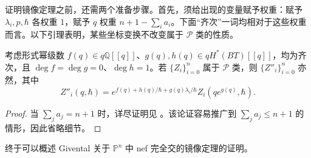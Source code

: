 证明镜像定理之前，还需两个准备步骤。首先，须给出现的变量赋予权重：赋予
$\lambda_i,p,\hbar$ 各权重 $1$，赋予 $q$ 权重 $n+1-\sum_i a_i$。下面“齐次”一词均相对于这些权重而言。以下引理表明，某些坐标变换不改变属于 $\mathcal P$ 类的性质。
\begin{lemma}\label{lem:complete-intersection-p-transformations}
考虑形式幂级数 $f(q)\in q\mathbb Q[[q]]$、$g(q),h(q)\in qH^*(BT)[[q]]$，均为齐次，且 $\deg f=\deg g=0$、$\deg h=1$。若 $\{Z_i\}_{i=0}^n$ 属于 $\mathcal P$ 类，则 $\{Z''_i\}_{i=0}^n$ 亦然，其中
\[
Z''_i(q,\hbar)=e^{f(q)+h(q)/\hbar+g(q)\lambda_i/\hbar}Z_i(qe^{g(q)},\hbar).
\]
\end{lemma}
\begin{proof}
当 $\sum_ja_j=n+1$ 时，详尽证明见 。该论证容易推广到 $\sum_ja_j\le n+1$ 的情形，因此省略细节。
\end{proof}
终于可以概述 Givental 关于 $\mathbb P^n$ 中 nef 完全交的镜像定理的证明。
